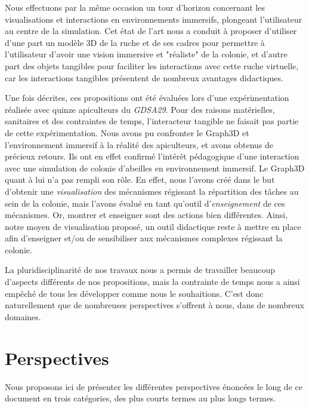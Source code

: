 Nous effectuons par la même occasion un tour d'horizon concernant les visualisations et interactions en environnements immersifs, plongeant l'utilisateur au centre de la simulation. Cet état de l'art nous a conduit à proposer d'utiliser d'une part un modèle 3D de la ruche et de ses cadres pour permettre à l'utilisateur d'avoir une vision immersive et "réaliste" de la colonie, et d'autre part des objets tangibles pour faciliter les interactions avec cette ruche virtuelle, car les interactions tangibles présentent de nombreux avantages didactiques.

Une fois décrites, ces propositions ont été évaluées lors d'une expérimentation réalisée avec quinze apiculteurs du \textit{GDSA29}. Pour des raisons matérielles, sanitaires et des contraintes de temps, l'interacteur tangible ne faisait pas partie de cette expérimentation. Nous avons pu confronter le Graph3D et l'environnement immersif à la réalité des apiculteurs, et avons obtenus de précieux retours. Ils ont en effet confirmé l'intérêt pédagogique d'une interaction avec une simulation de colonie d'abeilles en environnement immersif. Le Graph3D quant à lui n'a pas rempli son rôle. En effet, nous l'avons créé dans le but d'obtenir une \textit{visualisation} des mécanismes régissant la répartition des tâches au sein de la colonie, mais l'avons évalué en tant qu'outil d'\textit{enseignement} de ces mécanismes. Or, montrer et enseigner sont des actions bien différentes. Ainsi, notre moyen de visualisation proposé, un outil didactique reste à mettre en place afin d'enseigner et/ou de sensibiliser aux mécanismes complexes régissant la colonie.
	
	 La pluridisciplinarité de nos travaux nous a permis de travailler beaucoup d'aspects différents de nos propositions, mais la contrainte de temps nous a ainsi empêché de tous les développer comme nous le souhaitions. C'est donc naturellement que de nombreuses perspectives s'offrent à nous, dans de nombreux domaines.
	
\section*{Perspectives}
	Nous proposons ici de présenter les différentes perspectives énoncées le long de ce document en trois catégories, des plus courts termes au plus longs termes.
	
